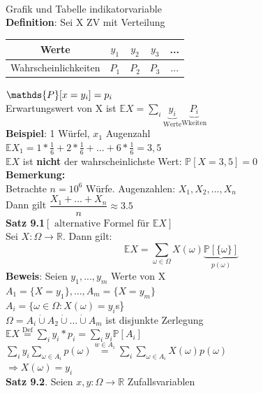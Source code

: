\medskip\\
Grafik und Tabelle indikatorvariable\medskip\\
\textbf{Definition}: Sei X ZV mit Verteilung\medskip\\
\begin{tabular}{c|c|c|c|c}
	Werte&$y_1$&$y_2$&$y_3$&...\\\hline
	Wahrscheinlichkeiten&$P_1$&$P_2$&$P_3$&...
\end{tabular} \hspace{1cm}$\smallskip\\\mathds{P}[x = y_i] = p_i$\medskip\\
Erwartungswert von X ist $\mathds{E} X = \sum_i \underbrace{y_i}_\text{Werte} \underbrace{P_i}_\text{Wkeiten}$\medskip\\
\textbf{Beispiel}: 1 Würfel, $x_1$ Augenzahl\\
$\mathds{E}X_1 = 1*\frac{1}{6}+2*\frac{1}{6}+...+6*\frac{1}{6} = 3,5$\\
$\mathds{E}X$ ist \textbf{nicht} der wahrscheinlichste Wert: $\mathds{P} [X=3,5] = 0$\medskip\\
\textbf{Bemerkung:}\\
Betrachte $n=10^6$ Würfe. Augenzahlen: $X_1,X_2,...,X_n$\smallskip\\
Dann gilt $\dfrac{X_1+...+X_n}{n}\approx 3.5$\medskip\\
\textbf{Satz 9.1}$[\text{ alternative Formel für }\mathds{E}X]$\\
Sei $X:\Omega \rightarrow\mathbb{R}$. Dann gilt: 
$$\mathds{E}X = \sum_{\omega \in \Omega} X(\omega)\underbrace{\mathds{P}[\{\omega\}]}_{p(\omega)}$$
\textbf{Beweis}: Seien $y_1,...,y_m$ Werte von X\medskip\\
$A_1 = \{X = y_1\},\dots ,A_m=\{X=y_m\}$\smallskip\\
$A_i = \{\omega \in \Omega:X(\omega)=y_i$s\}\smallskip\\
$\Omega = A_i \dot\cup A_2\dot\cup \dots\dot\cup A_m$ ist disjunkte Zerlegung\smallskip\\
$\mathds{E}X \overset{\text{Def}}{=} \sum_i y_i*p_i = \sum_i y_i \mathds{P}[A_i]$\smallskip\\
$\sum_iy_i\sum_{\omega \in A_i} p(\omega) \overset{w \in A_i}{=}\sum_i \sum_{\omega \in A_i} X(\omega)p(\omega)$ \medskip\\
$	\Rightarrow X(\omega)=y_i$\medskip\\
\textbf{Satz 9.2}. Seien $x,y :\Omega \rightarrow\mathbb{R}$ Zufallsvariablen\smallskip\\
